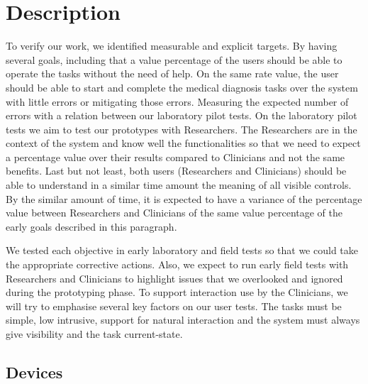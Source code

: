 
\section{Description}

To verify our work, we identified measurable and explicit targets. By having several goals, including that a value percentage of the users should be able to operate the tasks without the need of help. On the same rate value, the user should be able to start and complete the medical diagnosis tasks over the system with little errors or mitigating those errors. Measuring the expected number of errors with a relation between our laboratory pilot tests. On the laboratory pilot tests we aim to test our prototypes with Researchers. The Researchers are in the context of the system and know well the functionalities so that we need to expect a percentage value over their results compared to Clinicians and not the same benefits. Last but not least, both users (Researchers and Clinicians) should be able to understand in a similar time amount the meaning of all visible controls. By the similar amount of time, it is expected to have a variance of the percentage value between Researchers and Clinicians of the same value percentage of the early goals described in this paragraph.

We tested each objective in early laboratory and field tests so that we could take the appropriate corrective actions. Also, we expect to run early field tests with Researchers and Clinicians to highlight issues that we overlooked and ignored during the prototyping phase. To support interaction use by the Clinicians, we will try to emphasise several key factors on our user tests. The tasks must be simple, low intrusive, support for natural interaction and the system must always give visibility and the task current-state.

\clearpage


\subsection{Devices}

